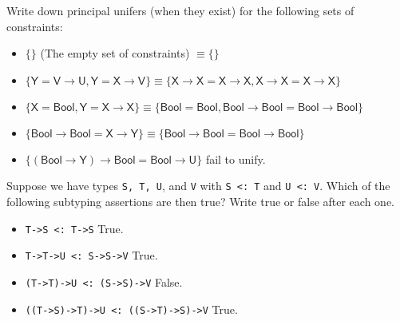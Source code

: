 \documentclass[12pt]{article}
\newenvironment{problem}[2][Problem]{\begin{trivlist}
\item[\hskip \labelsep {\bfseries #1}\hskip \labelsep {\bfseries #2.}]}{\end{trivlist}}
\begin{document}
\begin{problem}{2 (2 points)}
  Write down principal unifers (when they exist) for the following
  sets of constraints:
  \begin{itemize}

  \item $\mathsf{\{\}}$ (The empty set of constraints) $\equiv \{\}$

  \item $\mathsf{\{Y = V \rightarrow U, Y = X \rightarrow V\}} \equiv \mathsf{\{X \rightarrow X = X \rightarrow X, X \rightarrow X = X \rightarrow X\}}$

  \item $\mathsf{\{X = Bool, Y = X \rightarrow X\}} \equiv \mathsf{\{Bool = Bool, Bool \rightarrow Bool = Bool \rightarrow Bool\}}$

  \item $\mathsf{\{ Bool \rightarrow Bool = X \rightarrow Y \}} \equiv \mathsf{\{Bool \rightarrow Bool = Bool \rightarrow Bool\}}$

  \item $\mathsf{\{ (Bool \rightarrow Y) \rightarrow Bool = Bool \rightarrow U \}}$ fail to unify.

  \end{itemize}
\end{problem}

\begin{problem}{3 (2 points)}
  Suppose we have types \lstinline|S, T, U|, and \lstinline|V| with
  \lstinline|S <: T| and \lstinline|U <: V|.  Which of the following
  subtyping assertions are then true? Write true or false after each
  one.

  \begin{itemize}
  \item \lstinline|T->S <: T->S| True.

  \item \lstinline|T->T->U <: S->S->V| True.

  \item \lstinline|(T->T)->U <: (S->S)->V| False.

  \item \lstinline|((T->S)->T)->U <: ((S->T)->S)->V| True.

  \end{itemize}

\end{problem}
\end{document}
